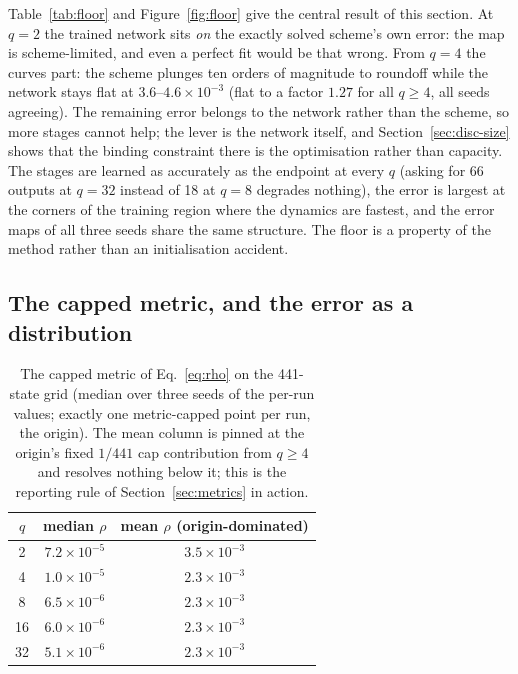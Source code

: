 \documentclass[11pt,a4paper]{article}
\begin{document}
Table~\ref{tab:floor} and Figure~\ref{fig:floor} give the central result
of this section. At $q = 2$ the trained network sits
\emph{on} the exactly solved scheme's own error: the map is
scheme-limited, and even a perfect fit would be that wrong. From $q = 4$
the curves part: the scheme plunges ten orders of magnitude to roundoff
while the network stays flat at $3.6$--$4.6\times10^{-3}$ (flat to a factor
$1.27$ for all $q \ge 4$, all seeds agreeing). The remaining error belongs
to the network rather than the scheme, so more stages cannot help; the
lever is the network itself, and Section~\ref{sec:disc-size} shows that
the binding constraint there is the optimisation rather than capacity. The
stages are learned as accurately as the endpoint at every $q$ (asking for
66 outputs at $q = 32$ instead of 18 at $q = 8$ degrades nothing), the
error is largest at the corners of the training region where the dynamics
are fastest, and the error maps of all three seeds share the same
structure. The floor is a property of the method rather than an
initialisation accident.

\subsection{The capped metric, and the error as a distribution}
\label{sec:disc-rho}

\begin{table}[tbp]
  \centering
  \caption{The capped metric of Eq.~\eqref{eq:rho} on the 441-state grid
  (median over three seeds of the per-run values; exactly one metric-capped
  point per run, the origin). The mean column is pinned at the origin's
  fixed $1/441$ cap contribution from $q \ge 4$ and resolves nothing below
  it; this is the reporting rule of Section~\ref{sec:metrics} in action.}
  \label{tab:rho}
  \small
  \begin{tabular}{ccc}
    \toprule
    $q$ & median $\rho$ & mean $\rho$ (origin-dominated) \\
    \midrule
    2  & $7.2\times10^{-5}$ & $3.5\times10^{-3}$ \\
    4  & $1.0\times10^{-5}$ & $2.3\times10^{-3}$ \\
    8  & $6.5\times10^{-6}$ & $2.3\times10^{-3}$ \\
    16 & $6.0\times10^{-6}$ & $2.3\times10^{-3}$ \\
    32 & $5.1\times10^{-6}$ & $2.3\times10^{-3}$ \\
    \bottomrule
  \end{tabular}
\end{table}
\end{document}
